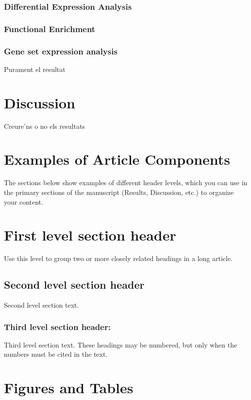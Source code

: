 \documentclass[9pt,twocolumn,twoside]{gsajnl}
\begin{document}
\subsubsection*{Differential Expression Analysis}
\subsubsection*{Functional Enrichment}
\subsubsection*{Gene set expression analysis}

Purament el resultat


\section*{Discussion}

Creure'ns o no els resultats


\section*{Examples of Article Components}
\label{sec:examples}

The sections below show examples of different header levels, which you can use in the primary sections of the manuscript (Results, Discussion, etc.) to organize your content.

\section*{First level section header}

Use this level to group two or more closely related headings in a long article.

\subsection*{Second level section header}

Second level section text.

\subsubsection*{Third level section header:}

Third level section text. These headings may be numbered, but only when the numbers must be cited in the text. 

\section*{Figures and Tables}
\end{document}
